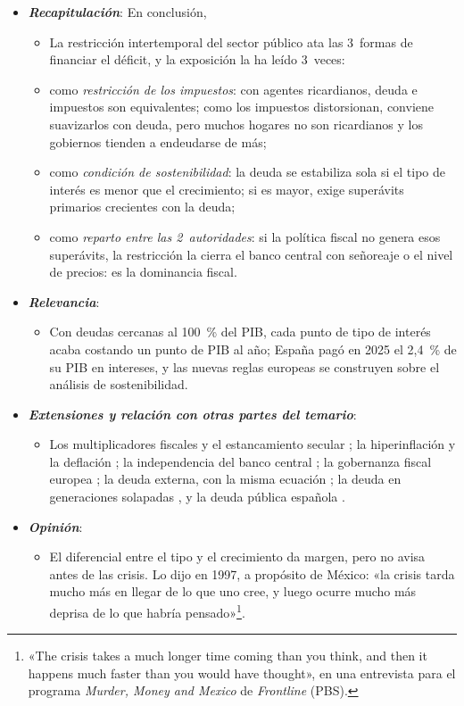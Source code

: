 \documentclass[11pt]{article}
\begin{document}
\begin{itemize}
\item \textbf{\emph{Recapitulación}}: En conclusión,
  \begin{itemize}
  \item La restricción intertemporal del sector público ata las 3~formas de financiar el déficit, y la exposición la ha leído 3~veces:
  \item como \emph{restricción de los impuestos}: con agentes ricardianos, deuda e impuestos son equivalentes; como los impuestos distorsionan, conviene suavizarlos con deuda, pero muchos hogares no son ricardianos y los gobiernos tienden a endeudarse de más;
  \item como \emph{condición de sostenibilidad}: la deuda se estabiliza sola si el tipo de interés es menor que el crecimiento; si es mayor, exige superávits primarios crecientes con la deuda;
  \item como \emph{reparto entre las 2~autoridades}: si la política fiscal no genera esos superávits, la restricción la cierra el banco central con señoreaje o el nivel de precios: es la dominancia fiscal.
  \end{itemize}
\item \textbf{\emph{Relevancia}}:
  \begin{itemize}
  \item Con deudas cercanas al 100~\% del PIB, cada punto de tipo de interés acaba costando un punto de PIB al año; España pagó en 2025 el 2,4~\% de su PIB en intereses\nocite{Eurostat2026EDP}, y las nuevas reglas europeas se construyen sobre el análisis de sostenibilidad.
  \end{itemize}
\item \textbf{\emph{Extensiones y relación con otras partes del temario}}:
  \begin{itemize}
  \item Los multiplicadores fiscales y el estancamiento secular ; la hiperinflación y la deflación ; la independencia del banco central ; la gobernanza fiscal europea ; la deuda externa, con la misma ecuación ; la deuda en generaciones solapadas , y la deuda pública española .
  \end{itemize}
\item \textbf{\emph{Opinión}}:
  \begin{itemize}
  \item El diferencial entre el tipo y el crecimiento da margen, pero no avisa antes de las crisis. Lo dijo  en 1997, a propósito de México: «la crisis tarda mucho más en llegar de lo que uno cree, y luego ocurre mucho más deprisa de lo que habría pensado»\footnote{«The crisis takes a much longer time coming than you think, and then it happens much faster than you would have thought», en una entrevista para el programa \emph{Murder, Money and Mexico} de \emph{Frontline} (PBS)\nocite{Dornbusch1997Frontline}.}.


\end{itemize}
\end{itemize}
\end{document}
